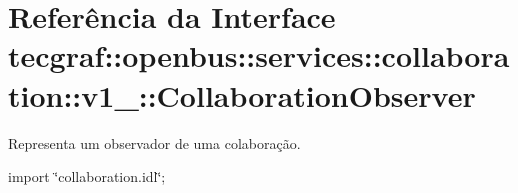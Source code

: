 \hypertarget{interfacetecgraf_1_1openbus_1_1services_1_1collaboration_1_1v1__0_1_1CollaborationObserver}{\section{\-Referência da \-Interface tecgraf\-:\-:openbus\-:\-:services\-:\-:collaboration\-:\-:v1\-\_\-:\-:\-Collaboration\-Observer}
\label{interfacetecgraf_1_1openbus_1_1services_1_1collaboration_1_1v1__0_1_1CollaborationObserver}
}


\-Representa um observador de uma colaboração.  




{\ttfamily import \char`\"{}collaboration.\-idl\char`\"{};}

